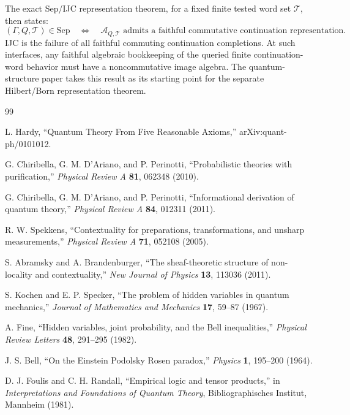 \documentclass[11pt]{article}
\newcommand{\Sep}{\mathrm{Sep}}
\newcommand{\AQtest}{\mathcal A_{Q,\mathcal T}}
\begin{document}
The exact Sep/IJC representation theorem, for a fixed finite tested word set $\mathcal T$, then states:
\[
 (\Gamma,Q,\mathcal T)\in\Sep
 \quad\Longleftrightarrow\quad
 \AQtest\text{ admits a faithful commutative continuation representation}.
\]
IJC is the failure of all faithful commuting continuation completions. At such interfaces, any faithful algebraic bookkeeping of the queried finite continuation-word behavior must have a noncommutative image algebra. The quantum-structure paper takes this result as its starting point for the separate Hilbert/Born representation theorem.

\begin{thebibliography}{99}

L. Hardy, ``Quantum Theory From Five Reasonable Axioms,'' arXiv:quant-ph/0101012.

G. Chiribella, G. M. D'Ariano, and P. Perinotti, ``Probabilistic theories with purification,'' \emph{Physical Review A} \textbf{81}, 062348 (2010).

G. Chiribella, G. M. D'Ariano, and P. Perinotti, ``Informational derivation of quantum theory,'' \emph{Physical Review A} \textbf{84}, 012311 (2011).

R. W. Spekkens, ``Contextuality for preparations, transformations, and unsharp measurements,'' \emph{Physical Review A} \textbf{71}, 052108 (2005).

S. Abramsky and A. Brandenburger, ``The sheaf-theoretic structure of non-locality and contextuality,'' \emph{New Journal of Physics} \textbf{13}, 113036 (2011).

S. Kochen and E. P. Specker, ``The problem of hidden variables in quantum mechanics,'' \emph{Journal of Mathematics and Mechanics} \textbf{17}, 59--87 (1967).

A. Fine, ``Hidden variables, joint probability, and the Bell inequalities,'' \emph{Physical Review Letters} \textbf{48}, 291--295 (1982).


J. S. Bell, ``On the Einstein Podolsky Rosen paradox,'' \emph{Physics} \textbf{1}, 195--200 (1964).

D. J. Foulis and C. H. Randall, ``Empirical logic and tensor products,'' in \emph{Interpretations and Foundations of Quantum Theory}, Bibliographisches Institut, Mannheim (1981).


\end{thebibliography}
\end{document}
